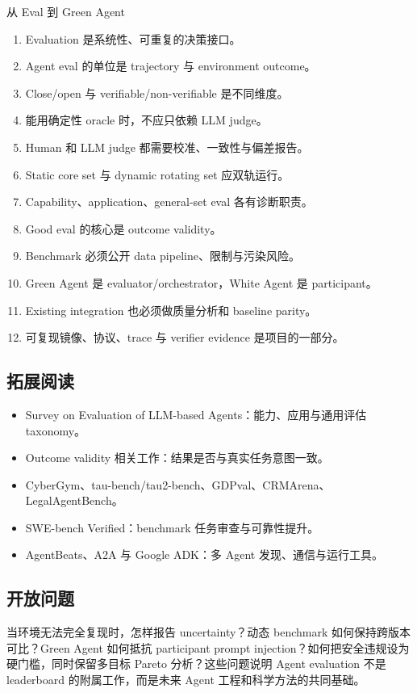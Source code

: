\begin{importantbox}{从 Eval 到 Green Agent}
\begin{enumerate}[leftmargin=*]
\item Evaluation 是系统性、可重复的决策接口。
\item Agent eval 的单位是 trajectory 与 environment outcome。
\item Close/open 与 verifiable/non-verifiable 是不同维度。
\item 能用确定性 oracle 时，不应只依赖 LLM judge。
\item Human 和 LLM judge 都需要校准、一致性与偏差报告。
\item Static core set 与 dynamic rotating set 应双轨运行。
\item Capability、application、general-set eval 各有诊断职责。
\item Good eval 的核心是 outcome validity。
\item Benchmark 必须公开 data pipeline、限制与污染风险。
\item Green Agent 是 evaluator/orchestrator，White Agent 是 participant。
\item Existing integration 也必须做质量分析和 baseline parity。
\item 可复现镜像、协议、trace 与 verifier evidence 是项目的一部分。
\end{enumerate}
\end{importantbox}

\subsection{拓展阅读}

\begin{itemize}
\item Survey on Evaluation of LLM-based Agents：能力、应用与通用评估 taxonomy。
\item Outcome validity 相关工作：结果是否与真实任务意图一致。
\item CyberGym、tau-bench/tau2-bench、GDPval、CRMArena、LegalAgentBench。
\item SWE-bench Verified：benchmark 任务审查与可靠性提升。
\item AgentBeats、A2A 与 Google ADK：多 Agent 发现、通信与运行工具。
\end{itemize}

\subsection{开放问题}

当环境无法完全复现时，怎样报告 uncertainty？动态 benchmark 如何保持跨版本可比？Green Agent 如何抵抗 participant prompt injection？如何把安全违规设为硬门槛，同时保留多目标 Pareto 分析？这些问题说明 Agent evaluation 不是 leaderboard 的附属工作，而是未来 Agent 工程和科学方法的共同基础。


